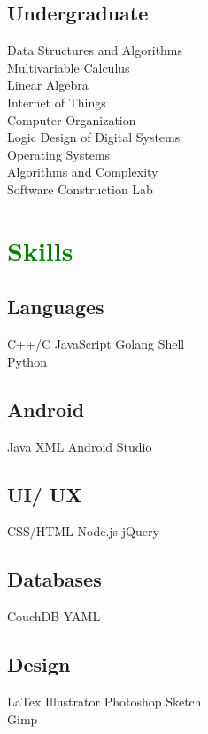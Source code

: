 \documentclass[letterpaper]{deedy-resume-openfont} %
\begin{document}
\begin{minipage}[t]{0.33\textwidth}
\subsection{Undergraduate}

Data Structures and Algorithms \\
Multivariable Calculus\\
Linear Algebra\\
Internet of Things\\
Computer Organization\\
Logic Design of Digital Systems\\
Operating Systems\\
Algorithms and Complexity\\
Software Construction Lab\\

\sectionsep %


\section{\textcolor{GREEN}{Skills}}
\subsection{Languages}
C++/C \textbullet{} JavaScript \textbullet{} Golang \textbullet{} Shell \textbullet{} \\
Python \\
\sectionsep
\subsection{Android}
Java \textbullet{} XML \textbullet{} Android Studio \\
\sectionsep
\subsection{UI/ UX}
CSS/HTML \textbullet{} Node.js \textbullet{} jQuery \\
\sectionsep
\subsection{Databases}
CouchDB \textbullet{} YAML
\sectionsep %
\subsection{Design}
LaTex \textbullet{} Illustrator \textbullet{} Photoshop \textbullet{} Sketch \textbullet{}\\
Gimp\\


\end{minipage}
\end{document}
